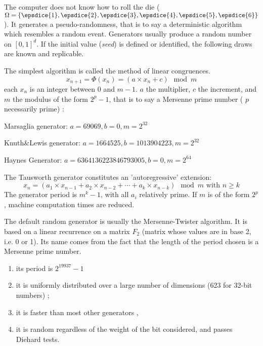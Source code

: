 \begin{f}
The computer does not know how to roll the die (\(\Omega=\{ \epsdice{1}, \epsdice{2}, \epsdice{3}, \epsdice{4}, \epsdice{5}, \epsdice{6} \}\)).
It generates a pseudo-randomness, that is to say a deterministic algorithm which resembles a random event.
Generators usually produce a random number on \([0,1]^d\).
If the initial value (\emph{seed}) is defined or identified, the following draws are known and replicable.


The simplest algorithm is called the method of linear congruences.
\[
x_{n+1}=\Phi(x_n)= (a\times x_n+c) \mod m
\] \small
each \(x_n\) is an integer between 0 and \(m-1\).
\(a\) the multiplier, \(c\) the increment, and \(m\) the modulus of the form \(2^p-1\), that is to say a Mersenne prime number ( \( p \) necessarily prime) :

Marsaglia generator: \(a=69069, b=0, m=2^{32}\)

Knuth\&Lewis generator: \(a=1664525, b=1013904223, m=2^{32}\)

Haynes Generator: \(a=6364136223846793005, b=0, m=2^{64}\)

The Tausworth generator constitutes an 'autoregressive' extension:
\[
x_{n}=(a_{1}\times x_{n-1}+a_{2}\times x_{n-2}+\cdots +a_{k}\times x_{n-k}) \mod m \text{ with } n\geq k
\]
The generator period is \(m^k-1\), with all \(a_i\) relatively prime. If \(m\) is of the form \(2^p\) , machine computation times are reduced.


The default random generator is usually the Mersenne-Twister algorithm. It is based on a linear recurrence on a matrix \(F_{2}\) (matrix whose values are in base 2, i.e. 0 or 1). 
Its name comes from the fact that the length of the period chosen is a Mersenne prime number.
\begin{enumerate}
	\item     its period is \(2^{19937}-1 \)
	\item     it is uniformly distributed over a large number of dimensions (623 for 32-bit numbers) ;
	\item     it is faster than most other generators ,
	\item     it is random regardless of the weight of the bit considered, and passes Diehard tests.
\end{enumerate}
\end{f}
%

